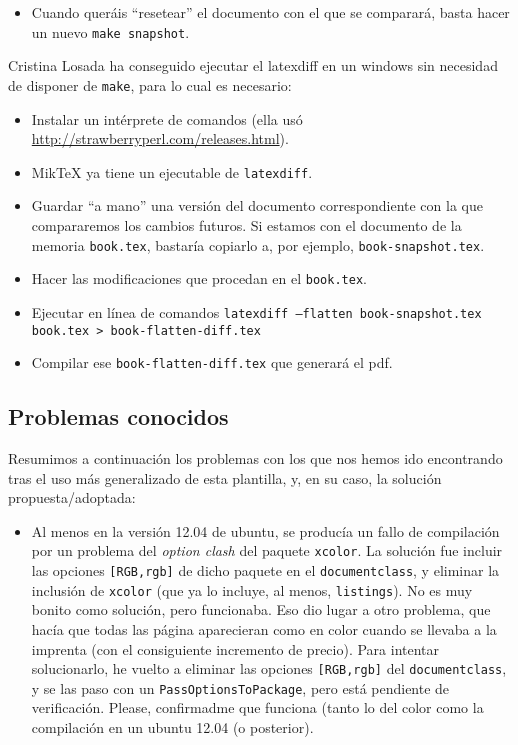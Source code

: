 {\begin{itemize}
    \item Cuando queráis ``resetear'' el documento con el que se comparará, basta hacer un nuevo \texttt{make snapshot}.
  \end{itemize}

  Cristina Losada ha conseguido ejecutar el latexdiff en un windows sin necesidad de disponer de \texttt{make}, para lo cual es necesario:

  \begin{itemize}
    \item Instalar un intérprete de comandos (ella usó \url{http://strawberryperl.com/releases.html}).

    \item MikTeX ya tiene un ejecutable de \texttt{latexdiff}.

    \item Guardar ``a mano'' una versión del documento correspondiente con la que compararemos los cambios futuros. Si estamos con el documento de la memoria \texttt{book.tex}, bastaría copiarlo a, por ejemplo, \texttt{book-snapshot.tex}.

    \item Hacer las modificaciones que procedan en el \texttt{book.tex}.

    \item Ejecutar en línea de comandos \texttt{latexdiff --flatten book-snapshot.tex book.tex > book-flatten-diff.tex}

    \item Compilar ese \texttt{book-flatten-diff.tex} que generará el pdf.

  \end{itemize}

  \subsection{Problemas conocidos}
  \label{sec:problemas-conocidos}

  Resumimos a continuación los problemas con los que nos hemos ido encontrando tras el uso más generalizado de esta plantilla, y, en su caso, la solución propuesta/adoptada:

  \begin{itemize}

    \item Al menos en la versión 12.04 de ubuntu, se producía un fallo de compilación por un problema del \textit{option clash} del paquete \texttt{xcolor}. La solución fue incluir las opciones \texttt{[RGB,rgb]} de dicho paquete en el \texttt{documentclass}, y eliminar la inclusión de \texttt{xcolor} (que ya lo incluye, al menos, \texttt{listings}). No es muy bonito como solución, pero funcionaba. Eso dio lugar a otro problema, que hacía que todas las página aparecieran como en color cuando se llevaba a la imprenta (con el consiguiente incremento de precio). Para intentar solucionarlo, he vuelto a eliminar las opciones \texttt{[RGB,rgb]} del \texttt{documentclass}, y se las paso con un \texttt{PassOptionsToPackage}, pero está pendiente de verificación. Please, confirmadme que funciona (tanto lo del color como la compilación en un ubuntu 12.04 (o posterior).


\end{itemize}}
